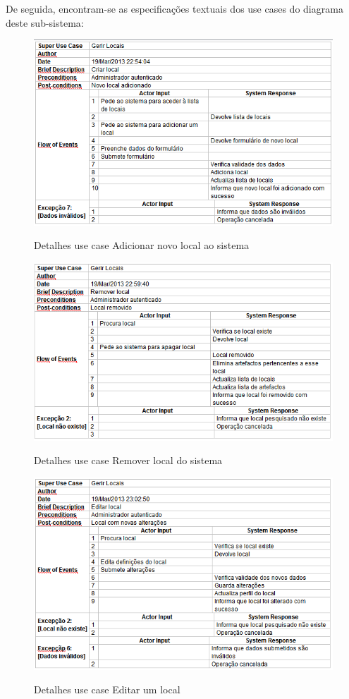 ﻿\documentclass[12pt,a4paper]{article}
\begin{document}
De seguida, encontram-se as especificações textuais dos use cases do diagrama deste sub-sistema:\\

\begin{figure}[h!]
\centering
\includegraphics[scale=0.7]{d_usecase/A_criarlocal}
\label{usecase}
\caption{Detalhes use case Adicionar novo local ao sistema}
\end{figure}

\begin{figure}[h!]
\centering
\includegraphics[scale=0.7]{d_usecase/A_removerlocal}
\label{usecase}
\caption{Detalhes use case Remover local do sistema}
\end{figure}

\begin{figure}[h!]
\centering
\includegraphics[scale=0.7]{d_usecase/A_editarlocal}
\label{usecase}
\caption{Detalhes use case Editar um local}
\end{figure}
\end{document}
